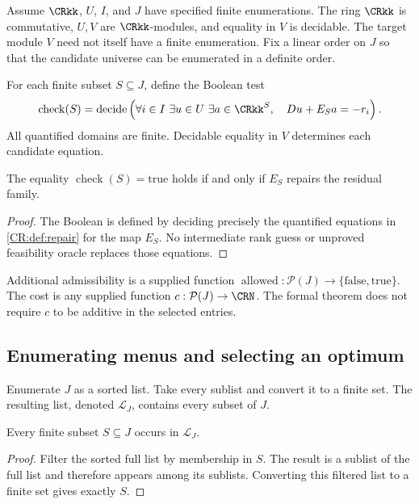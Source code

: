 Assume $\CRkk$, $U$, $I$, and $J$ have specified finite enumerations. The ring $\CRkk$ is commutative, $U,V$ are $\CRkk$-modules, and equality in $V$ is decidable. The target module $V$ need not itself have a finite enumeration. Fix a linear order on $J$ so that the candidate universe can be enumerated in a definite order.

For each finite subset $S\subseteq J$, define the Boolean test
\begin{equation}\label{CR:eq:boolean-check}
\operatorname{check}(S)=\operatorname{decide}\left(
\forall i\in I\ \exists u\in U\ \exists a\in\CRkk^S,\quad Du+E_Sa=-r_i
\right).
\end{equation}
All quantified domains are finite. Decidable equality in $V$ determines each candidate equation.

\begin{CRproposition}\label{CR:prop:check}
The equality $\operatorname{check}(S)=\mathrm{true}$ holds if and only if $E_S$ repairs the residual family.
\end{CRproposition}
\begin{proof}
The Boolean is defined by deciding precisely the quantified equations in \cref{CR:def:repair} for the map $E_S$. No intermediate rank guess or unproved feasibility oracle replaces those equations.
\end{proof}

Additional admissibility is a supplied function $\operatorname{allowed}:\mathcal P(J)\to\{\mathrm{false},\mathrm{true}\}$. The cost is any supplied function $c:\mathcal P(J)\to\CRN$. The formal theorem does not require $c$ to be additive in the selected entries.

\subsection{Enumerating menus and selecting an optimum}
Enumerate $J$ as a sorted list. Take every sublist and convert it to a finite set. The resulting list, denoted $\mathcal L_J$, contains every subset of $J$.

\begin{CRlemma}\label{CR:lem:allmenus}
Every finite subset $S\subseteq J$ occurs in $\mathcal L_J$.
\end{CRlemma}
\begin{proof}
Filter the sorted full list by membership in $S$. The result is a sublist of the full list and therefore appears among its sublists. Converting this filtered list to a finite set gives exactly $S$.
\end{proof}

